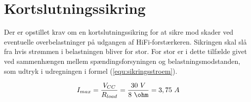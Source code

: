 \section{Kortslutningssikring}
\label{valg_kortslutningssikring}
Der er opstillet krav om en kortslutningssikring for at sikre mod skader ved eventuelle overbelastninger på udgangen af HiFi-forstærkeren. Sikringen skal slå fra hvis strømmen i belastningen bliver for stor. For stor er i dette tilfælde givet ved sammenhængen mellem spændingsforsyningen og belastningsmodstanden, som udtryk i udregningen i formel (\ref{equ:sikringsstroem}).

\begin{equation}
\label{equ:sikringsstroem}
I_{max}=\frac{V_{CC}}{R_{load}}=\frac{30~V}{8~\ohm}=3,75~A
\end{equation}